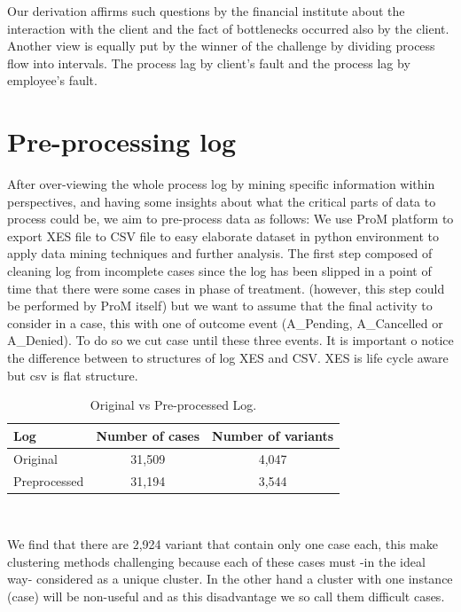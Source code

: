 
Our derivation affirms such questions by the financial institute about the interaction with the client and the fact of bottlenecks occurred also by the client.
Another view is equally put by the winner of the challenge\cite{winner} by dividing process flow into intervals. The process lag by client’s fault and the process lag by employee’s fault.




\section{Pre-processing log}

After over-viewing the whole process log by mining specific information within perspectives, and having some insights about what the critical parts of data to process could be, we aim to pre-process data as follows:
We use ProM platform to export XES file to CSV file to easy elaborate dataset in python environment to apply data mining techniques and further analysis.
The first step composed of cleaning log from incomplete cases since the log has been slipped in a point of time that there were some cases in phase of treatment.
(however, this step could be performed by ProM itself) but we want to assume that the final activity to consider in a case, this with one of outcome event (A\_Pending, A\_Cancelled or A\_Denied). To do so we cut case until these three events. It is important o notice the difference between to structures of log XES and CSV. XES is life cycle aware but csv is flat structure.
\begin{center}
\begin{table}[h]
\begin{tabular}{ l|c|c } 
 
 Log & Number of cases & Number of variants \\
 \hline
 Original & 31,509 & 4,047 \\ 
 
 Preprocessed & 31,194 & 3,544 \\ 


\end{tabular}
\caption{Original vs Pre-processed Log.\label{preprocessed}}\\
\end{table}
\end{center}

We find that there are 2,924 variant that contain only one case each, this make clustering methods challenging because each of these cases must -in the ideal way- considered as a unique cluster. In the other hand a cluster with one instance (case) will be non-useful and as this disadvantage we so call them difficult cases.





